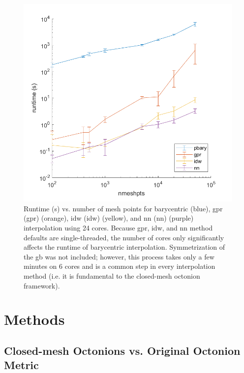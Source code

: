 \documentclass[preprint,12pt]{elsarticle}
\begin{document}
\begin{figure}
    \centering
    \includegraphics{runtime.png}
    \caption{Runtime (s) vs. number of mesh points for barycentric (blue), \acrlong{gpr} (\acrshort{gpr}) (orange), \acrlong{idw} (\acrshort{idw}) (yellow), and \acrlong{nn} (\acrshort{nn}) (purple) interpolation using 24 cores. Because \acrshort{gpr}, \acrshort{idw}, and \acrshort{nn} method defaults are single-threaded, the number of cores only significantly affects the runtime of barycentric interpolation. Symmetrization of the \acrlong{gb} was not included; however, this process takes only a few minutes on 6 cores and is a common step in every interpolation method (i.e. it is fundamental to the closed-mesh octonion framework).}
    \label{fig:runtime}
\end{figure}

\section{Methods} \label{sec:methods}

\subsection{Closed-mesh Octonions vs. Original Octonion Metric} \label{sec:methods:closed-mesh}
\end{document}
